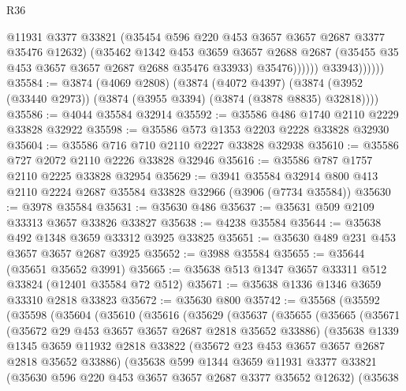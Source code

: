 \begin{lexlean}{R36}
\begin{coremodule}
                          @11931
                          @3377
                          @33821
                          (@35454 @596 @220 @453 @3657 @3657 @2687 @3377 @35476 @12632)
                          (@35462
                            @1342
                            @453
                            @3659
                            @3657
                            @2688
                            @2687
                            (@35455 @35 @453 @3657 @3657 @2687 @2688 @35476 @33933)
                            @35476))))))
                @33943))))))
@35584 := @3874
    (@4069 @2808)
    (@3874
      (@4072 @4397)
      (@3874 (@3952 (@33440 @2973)) (@3874 (@3955 @3394) (@3874 (@3878 @8835) @32818))))
@35586 := @4044 @35584 @32914
@35592 := @35586 @486 @1740 @2110 @2229 @33828 @32922
@35598 := @35586 @573 @1353 @2203 @2228 @33828 @32930
@35604 := @35586 @716 @710 @2110 @2227 @33828 @32938
@35610 := @35586 @727 @2072 @2110 @2226 @33828 @32946
@35616 := @35586 @787 @1757 @2110 @2225 @33828 @32954
@35629 := @3941
    @35584
    @32914
    @800
    @413
    @2110
    @2224
    @2687
    @35584
    @33828
    @32966
    (@3906 (@7734 @35584))
@35630 := @3978 @35584
@35631 := @35630 @486
@35637 := @35631 @509 @2109 @33313 @3657 @33826 @33827
@35638 := @4238 @35584
@35644 := @35638 @492 @1348 @3659 @33312 @3925 @33825
@35651 := @35630 @489 @231 @453 @3657 @3657 @2687 @3925
@35652 := @3988 @35584
@35655 := @35644 (@35651 @35652 @3991)
@35665 := @35638 @513 @1347 @3657 @33311 @512 @33824 (@12401 @35584 @72 @512)
@35671 := @35638 @1336 @1346 @3659 @33310 @2818 @33823
@35672 := @35630 @800
@35742 := @35568
    (@35592
      (@35598
        (@35604
          (@35610
            (@35616
              (@35629
                (@35637
                  (@35655
                    (@35665
                      (@35671
                        (@35672 @29 @453 @3657 @3657 @2687 @2818 @35652 @33886)
                        (@35638
                          @1339
                          @1345
                          @3659
                          @11932
                          @2818
                          @33822
                          (@35672 @23 @453 @3657 @3657 @2687 @2818 @35652 @33886)
                          (@35638
                            @599
                            @1344
                            @3659
                            @11931
                            @3377
                            @33821
                            (@35630 @596 @220 @453 @3657 @3657 @2687 @3377 @35652 @12632)
                            (@35638

\end{coremodule}
\end{lexlean}

